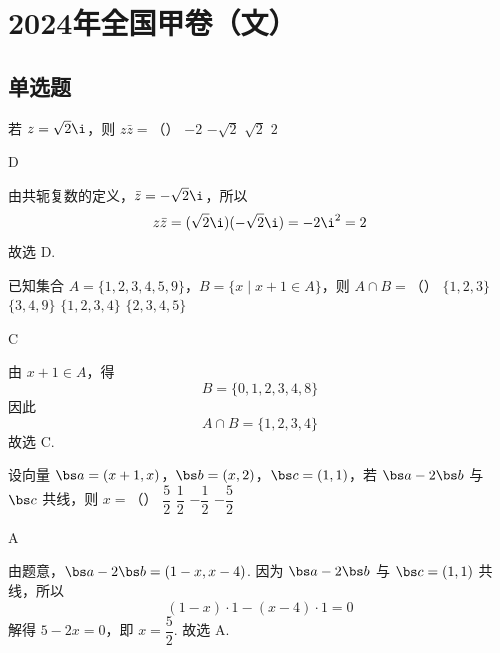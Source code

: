 \chapter{2024年全国甲卷（文）}

\section{单选题}

\begin{problem}
若 \(z=\sqrt{2}\i\)，则 \(z\bar z=\)（\quad）
\choices
    {\(-2\)}
    {\(-\sqrt{2}\)}
    {\(\sqrt{2}\)}
    {\(2\)}
\end{problem}

\begin{answer}
D
\end{answer}

\begin{solution}
由共轭复数的定义，\(\bar z=-\sqrt2\i\)，所以
\[
z\bar z=(\sqrt2\i)(-\sqrt2\i)=-2\i^2=2
\]
故选 D.
\end{solution}

\begin{problem}
已知集合 \(A=\{1,2,3,4,5,9\}\)，\(B=\{x\mid x+1\in A\}\)，则 \(A\cap B=\)（\quad）
\choices
    {\(\{1,2,3\}\)}
    {\(\{3,4,9\}\)}
    {\(\{1,2,3,4\}\)}
    {\(\{2,3,4,5\}\)}
\end{problem}

\begin{answer}
C
\end{answer}

\begin{solution}
由 \(x+1\in A\)，得
\[
B=\{0,1,2,3,4,8\}
\]
因此
\[
A\cap B=\{1,2,3,4\}
\]
故选 C.
\end{solution}

\begin{problem}
设向量 \(\bs a=(x+1,x)\)，\(\bs b=(x,2)\)，\(\bs c=(1,1)\)，若 \(\bs a-2\bs b\) 与 \(\bs c\) 共线，则 \(x=\)（\quad）
\choices
    {\(\dfrac52\)}
    {\(\dfrac12\)}
    {\(-\dfrac12\)}
    {\(-\dfrac52\)}
\end{problem}

\begin{answer}
A
\end{answer}

\begin{solution}
由题意，\(\bs a-2\bs b=(1-x,x-4)\). 因为 \(\bs a-2\bs b\) 与 \(\bs c=(1,1)\) 共线，所以
\[
(1-x)\cdot 1-(x-4)\cdot 1=0
\]
解得 \(5-2x=0\)，即 \(x=\dfrac52\). 故选 A.
\end{solution}

